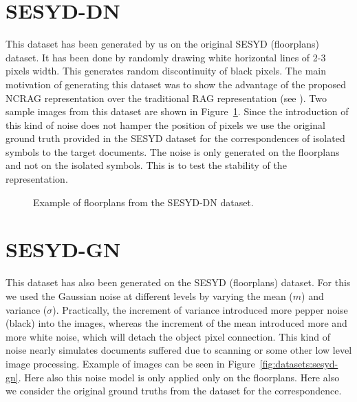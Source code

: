 \section{SESYD-DN}
\label{sec:datasets:sesyd-dn}
This dataset has been generated by us on the original SESYD (floorplans) dataset. It has been done by randomly drawing white horizontal lines of 2-3 pixels width. This generates random discontinuity of black pixels. The main motivation of generating this dataset was to show the advantage of the proposed NCRAG representation over the traditional RAG representation (see ). Two sample images from this dataset are shown in Figure~\ref{fig:datasets:sesyd-dn}. Since the introduction of this kind of noise does not hamper the position of pixels we use the original ground truth provided in the SESYD dataset for the correspondences of isolated symbols to the target documents. The noise is only generated on the floorplans and not on the isolated symbols. This is to test the stability of the representation.
\begin{figure}[h!]
\begin{center}
\subfloat{\texttt{[image: 01\_00-DN]}}
\hspace{0.5mm}
\subfloat{\texttt{[image: 01\_01-DN]}}
\end{center}
\caption{Example of floorplans from the SESYD-DN dataset.}
\label{fig:datasets:sesyd-dn}
\end{figure}

\section{SESYD-GN}
\label{sec:datasets:sesyd-gn}
This dataset has also been generated on the SESYD (floorplans) dataset. For this we used the Gaussian noise at different levels by varying the mean ($m$) and variance ($\sigma$). Practically, the increment of variance introduced more pepper noise (black) into the images, whereas the increment of the mean introduced more and more white noise, which will detach the object pixel connection. This kind of noise nearly simulates documents suffered due to scanning or some other low level image processing. Example of images can be seen in Figure~\ref{fig:datasets:sesyd-gn}. Here also this noise model is only applied only on the floorplans. Here also we consider the original ground truths from the dataset for the correspondence.

